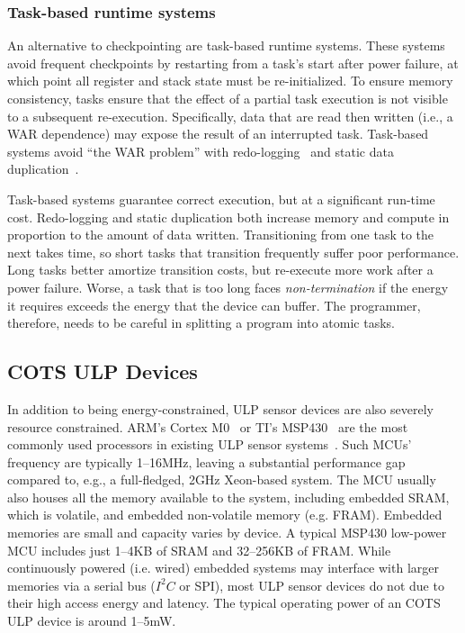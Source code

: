 \subsubsection{Task-based runtime systems}
\label{chapter:background:intermittent:task}
An alternative to checkpointing are task-based runtime systems.
% 
These systems avoid frequent checkpoints by
restarting from a task's start after power failure,
at which point all register and stack state must be re-initialized.
% 
To ensure memory consistency, tasks ensure that the effect of a
partial task execution is not visible to a subsequent re-execution.
Specifically, data that are read then written (i.e., a WAR dependence) may expose the result of an interrupted task.
% 
Task-based systems avoid ``the WAR problem'' with
redo-logging~\cite{alpaca} and static data duplication~\cite{chain}.


Task-based systems guarantee correct execution, but at a significant run-time cost.
% 
Redo-logging and static duplication both increase memory and compute
in proportion to the amount of data written.
% 
Transitioning from one task to the next takes time, so
short tasks that transition frequently suffer poor performance.
Long tasks better amortize transition costs,
but re-execute more work after a power failure.
% 
Worse, a task that is too long faces {\em non-termination} if the energy it
requires exceeds the energy that the device can buffer.
% 
The programmer, therefore, needs to be careful in splitting a program into atomic tasks.

\subsection{COTS ULP Devices}
In addition to being energy-constrained, ULP sensor devices are also severely resource constrained.
% 
ARM's Cortex M0~\cite{cortexm0} or TI's MSP430~\cite{msp430fr5994} are 
the most commonly used processors in existing ULP sensor
systems~\cite{wisp,capybara,flicker,ufop,amulet,wolverine}.
%
Such MCUs' frequency are typically 1--16MHz, leaving a
substantial performance gap compared to, e.g., a full-fledged, 2GHz Xeon-based
system.  
%
The MCU usually also houses all the memory available to
the system, including embedded SRAM, which is volatile, and embedded non-volatile memory (e.g. FRAM).  
%
Embedded memories are small and capacity varies by device. 
% 
A typical MSP430
low-power MCU includes just 1--4KB of SRAM and 32--256KB of FRAM.
% 
While
continuously powered (i.e. wired) embedded systems may interface with larger memories
via a serial bus ($I^{2}C$ or SPI), most ULP sensor devices do
not due to their high access energy and latency.
%
The typical operating power of an COTS ULP device is around 1--5mW.

